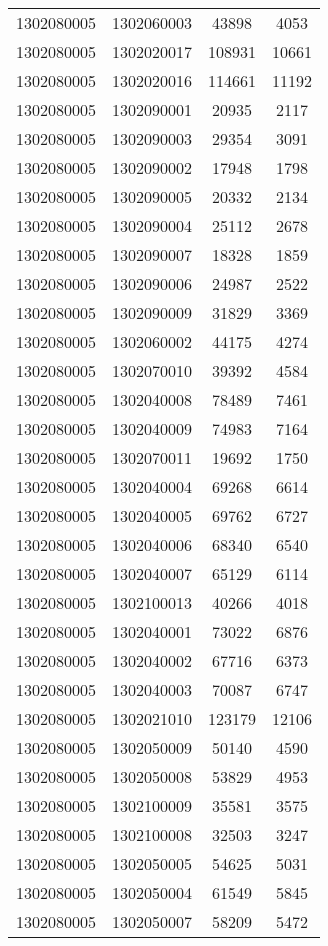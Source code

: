 \begin{longtable}[h]{llcc}
		1302080005 & 1302060003 & 43898 & 4053\\
		1302080005 & 1302020017 & 108931 & 10661\\
		1302080005 & 1302020016 & 114661 & 11192\\
		1302080005 & 1302090001 & 20935 & 2117\\
		1302080005 & 1302090003 & 29354 & 3091\\
		1302080005 & 1302090002 & 17948 & 1798\\
		1302080005 & 1302090005 & 20332 & 2134\\
		1302080005 & 1302090004 & 25112 & 2678\\
		1302080005 & 1302090007 & 18328 & 1859\\
		1302080005 & 1302090006 & 24987 & 2522\\
		1302080005 & 1302090009 & 31829 & 3369\\
		1302080005 & 1302060002 & 44175 & 4274\\
		1302080005 & 1302070010 & 39392 & 4584\\
		1302080005 & 1302040008 & 78489 & 7461\\
		1302080005 & 1302040009 & 74983 & 7164\\
		1302080005 & 1302070011 & 19692 & 1750\\
		1302080005 & 1302040004 & 69268 & 6614\\
		1302080005 & 1302040005 & 69762 & 6727\\
		1302080005 & 1302040006 & 68340 & 6540\\
		1302080005 & 1302040007 & 65129 & 6114\\
		1302080005 & 1302100013 & 40266 & 4018\\
		1302080005 & 1302040001 & 73022 & 6876\\
		1302080005 & 1302040002 & 67716 & 6373\\
		1302080005 & 1302040003 & 70087 & 6747\\
		1302080005 & 1302021010 & 123179 & 12106\\
		1302080005 & 1302050009 & 50140 & 4590\\
		1302080005 & 1302050008 & 53829 & 4953\\
		1302080005 & 1302100009 & 35581 & 3575\\
		1302080005 & 1302100008 & 32503 & 3247\\
		1302080005 & 1302050005 & 54625 & 5031\\
		1302080005 & 1302050004 & 61549 & 5845\\
		1302080005 & 1302050007 & 58209 & 5472\\

\end{longtable}
